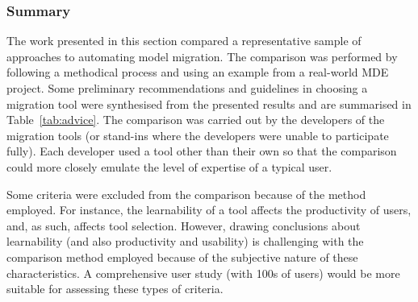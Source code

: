 \subsubsection{Summary}
The work presented in this section compared a representative sample of approaches to automating model migration. The comparison was performed by following a methodical process and using an example from a real-world MDE project. Some preliminary recommendations and guidelines in choosing a migration tool were synthesised from the presented results and are summarised in Table~\ref{tab:advice}. The comparison was carried out by the developers of the migration tools (or stand-ins where the developers were unable to participate fully). Each developer used a tool other than their own so that the comparison could more closely emulate the level of expertise of a typical user.

Some criteria were excluded from the comparison because of the method employed. For instance, the learnability of a tool affects the productivity of users, and, as such, affects tool selection. However, drawing conclusions about learnability (and also productivity and usability) is challenging with the comparison method employed because of the subjective nature of these characteristics. A comprehensive user study (with 100s of users) would be more suitable for assessing these types of criteria.
